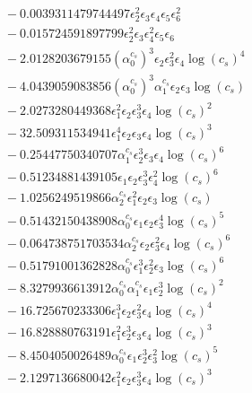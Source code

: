 \documentclass[10pt]{article}
\begin{document}
\begin{align*}
&{}  - 0.0039311479744497 \epsilon_{2}^{2} \epsilon_{3} \epsilon_{4} \epsilon_{5} \epsilon_{6}^{2} \\
&{}  - 0.015724591897799 \epsilon_{2}^{2} \epsilon_{3} \epsilon_{4}^{2} \epsilon_{5} \epsilon_{6} \\
&{}  - 2.0128203679155 \left(\alpha_{0}^{c_s}\right)^{3} \epsilon_{2} \epsilon_{3}^{2} \epsilon_{4} \log{\left(c_{s} \right)}^{4} \\
&{}  - 4.0439059083856 \left(\alpha_{0}^{c_s}\right)^{3} \alpha_{1}^{c_s} \epsilon_{2} \epsilon_{3} \log{\left(c_{s} \right)} \\
&{}  - 2.0273280449368 \epsilon_{1}^{2} \epsilon_{2} \epsilon_{3}^{3} \epsilon_{4} \log{\left(c_{s} \right)}^{2} \\
&{}  - 32.509311534941 \epsilon_{1}^{4} \epsilon_{2} \epsilon_{3} \epsilon_{4} \log{\left(c_{s} \right)}^{3} \\
&{}  - 0.25447750340707 \alpha_{1}^{c_s} \epsilon_{2}^{3} \epsilon_{3} \epsilon_{4} \log{\left(c_{s} \right)}^{6} \\
&{}  - 0.51234881439105 \epsilon_{1} \epsilon_{2} \epsilon_{3}^{3} \epsilon_{4}^{2} \log{\left(c_{s} \right)}^{6} \\
&{}  - 1.0256249519866 \alpha_{2}^{c_s} \epsilon_{1}^{2} \epsilon_{2} \epsilon_{3} \log{\left(c_{s} \right)} \\
&{}  - 0.51432150438908 \alpha_{0}^{c_s} \epsilon_{1} \epsilon_{2} \epsilon_{3}^{4} \log{\left(c_{s} \right)}^{5} \\
&{}  - 0.064738751703534 \alpha_{2}^{c_s} \epsilon_{2} \epsilon_{3}^{2} \epsilon_{4} \log{\left(c_{s} \right)}^{6} \\
&{}  - 0.51791001362828 \alpha_{0}^{c_s} \epsilon_{1}^{3} \epsilon_{2}^{2} \epsilon_{3} \log{\left(c_{s} \right)}^{6} \\
&{}  - 8.3279936613912 \alpha_{0}^{c_s} \alpha_{1}^{c_s} \epsilon_{1} \epsilon_{2}^{3} \log{\left(c_{s} \right)}^{2} \\
&{}  - 16.725670233306 \epsilon_{1}^{3} \epsilon_{2} \epsilon_{3}^{2} \epsilon_{4} \log{\left(c_{s} \right)}^{4} \\
&{}  - 16.828880763191 \epsilon_{1}^{2} \epsilon_{2}^{3} \epsilon_{3} \epsilon_{4} \log{\left(c_{s} \right)}^{3} \\
&{}  - 8.4504050026489 \alpha_{0}^{c_s} \epsilon_{1} \epsilon_{2}^{3} \epsilon_{3}^{2} \log{\left(c_{s} \right)}^{5} \\
&{}  - 2.1297136680042 \epsilon_{1}^{2} \epsilon_{2} \epsilon_{3}^{3} \epsilon_{4} \log{\left(c_{s} \right)}^{3} \\

\end{align*}
\end{document}
